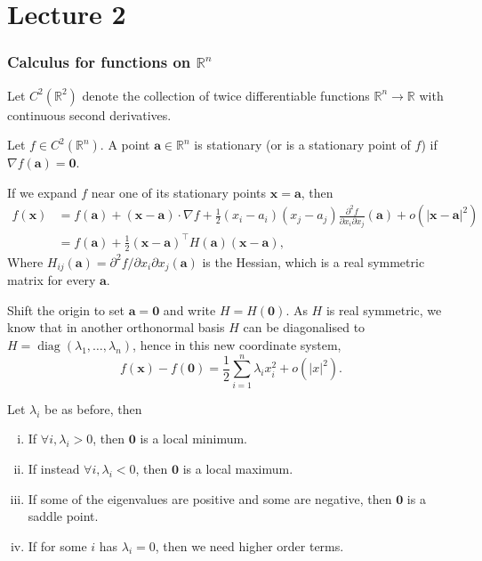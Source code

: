 \documentclass{article}
\begin{document}
\part*{Lecture 2}
\section{Calculus for functions on $ \mathbb{R} ^n $}
Let $C^2(\mathbb R^2)$ denote the collection of twice differentiable functions $\mathbb R^n\to\mathbb R$ with continuous second derivatives.
\begin{definition}
    Let $f\in C^2(\mathbb R^n)$.
    A point $\mathbf{a}\in\mathbb R^n$ is stationary (or is a stationary point of $f$) if $\nabla f(\mathbf{a})=\mathbf{0}$.
\end{definition}
If we expand $f$ near one of its stationary points $\mathbf{x}=\mathbf{a}$, then
\begin{align*}
    f(\mathbf{x})&=f(\mathbf{a})+(\mathbf{x}-\mathbf{a})\cdot\nabla f+\frac{1}{2}(x_i-a_i)(x_j-a_j)\frac{\partial^2f}{\partial x_i\partial x_j}(\mathbf{a})+o(|\mathbf{x}-\mathbf{a}|^2)\\
    &=f(\mathbf{a})+\frac{1}{2}(\mathbf{x}-\mathbf{a})^\top H(\mathbf{a})(\mathbf{x}-\mathbf{a}),
\end{align*}
Where $H_{ij}(\mathbf{a})=\partial^2f/\partial x_i\partial x_j(\mathbf{a})$ is the Hessian, which is a real symmetric matrix for every $\mathbf{a}$.

Shift the origin to set $\mathbf{a}=\mathbf{0}$ and write $H=H(\mathbf{0})$.
As $H$ is real symmetric, we know that in another orthonormal basis $H$ can be diagonalised to $H=\operatorname{diag}(\lambda_1,\ldots,\lambda_n)$, hence in this new coordinate system,
$$f(\mathbf{x})-f(\mathbf{0})=\frac{1}{2}\sum_{i=1}^n\lambda_ix_i^2+o(|x|^2).$$

\begin{theorem}
    Let $\lambda_i$ be as before, then 
    \begin{enumerate}[(i)]
        \item If $\forall i,\lambda_i>0$, then $\mathbf{0}$ is a local minimum.
        \item If instead $\forall i,\lambda_i<0$, then $\mathbf{0}$ is a local maximum.
        \item If some of the eigenvalues are positive and some are negative, then $ \mathbf{0} $ is a saddle point.
        \item If for some $i$ has $\lambda_i=0$, then we need higher order terms. 
    \end{enumerate}
\end{theorem}
\end{document}
